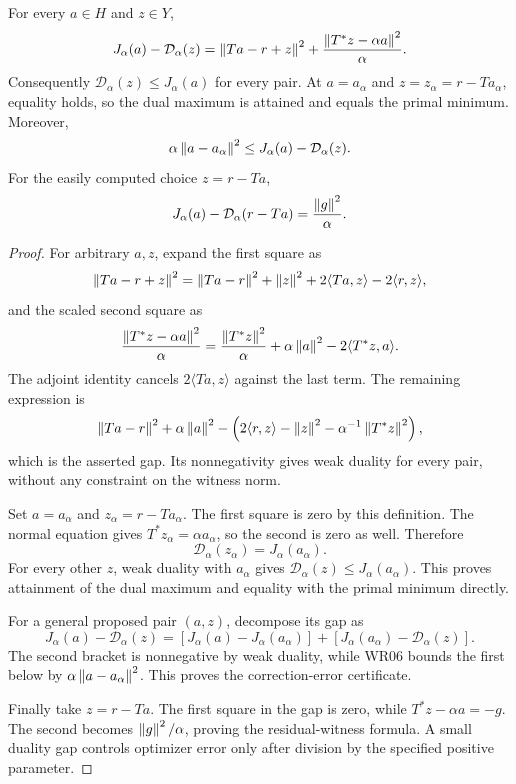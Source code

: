 \begin{theorem}\label{WR14}
For every $a\in H$ and $z\in Y$,
\begin{equation}\label{eq:regularized-duality-gap}
 J_\alpha(a)-\mathcal D_\alpha(z)
 =\left\lVert Ta-r+z\right\rVert^2+
   \frac{\left\lVert T^*z-\alpha a\right\rVert^2}{\alpha}.
\end{equation}
Consequently $\mathcal D_\alpha(z)\le J_\alpha(a)$ for every pair. At
$a=a_\alpha$ and $z=z_\alpha=r-Ta_\alpha$, equality holds, so the dual maximum is attained and equals the primal minimum. Moreover,
\[
 \alpha\left\lVert a-a_\alpha\right\rVert^2
 \le J_\alpha(a)-\mathcal D_\alpha(z).
\]
For the easily computed choice $z=r-Ta$,
\begin{equation}\label{eq:residual-dual-gap}
 J_\alpha(a)-\mathcal D_\alpha(r-Ta)=\frac{\left\lVert g\right\rVert^2}{\alpha}.
\end{equation}
\end{theorem}
\begin{proof}
For arbitrary $a,z$, expand the first square as
\[
 \left\lVert Ta-r+z\right\rVert^2
 =\left\lVert Ta-r\right\rVert^2+\left\lVert z\right\rVert^2+2\langle Ta,z\rangle-2\langle r,z\rangle,
\]
and the scaled second square as
\[
 \frac{\left\lVert T^*z-\alpha a\right\rVert^2}{\alpha}
 =\frac{\left\lVert T^*z\right\rVert^2}{\alpha}+\alpha\left\lVert a\right\rVert^2
       -2\langle T^*z,a\rangle.
\]
The adjoint identity cancels $2\langle Ta,z\rangle$ against the last term. The remaining expression is
\[
 \left\lVert Ta-r\right\rVert^2+\alpha\left\lVert a\right\rVert^2
 -\left(2\langle r,z\rangle-\left\lVert z\right\rVert^2
                    -\alpha^{-1}\left\lVert T^*z\right\rVert^2\right),
\]
which is the asserted gap. Its nonnegativity gives weak duality for every pair, without any constraint on the witness norm.

Set $a=a_\alpha$ and $z_\alpha=r-Ta_\alpha$. The first square is zero by this definition. The normal equation gives $T^*z_\alpha=\alpha a_\alpha$, so the second is zero as well. Therefore
\[
 \mathcal D_\alpha(z_\alpha)=J_\alpha(a_\alpha).
\]
For every other $z$, weak duality with $a_\alpha$ gives $\mathcal D_\alpha(z)\le J_\alpha(a_\alpha)$. This proves attainment of the dual maximum and equality with the primal minimum directly.

For a general proposed pair $(a,z)$, decompose its gap as
\[
 J_\alpha(a)-\mathcal D_\alpha(z)
 =[J_\alpha(a)-J_\alpha(a_\alpha)]
  +[J_\alpha(a_\alpha)-\mathcal D_\alpha(z)].
\]
The second bracket is nonnegative by weak duality, while WR06 bounds the first below by $\alpha\left\lVert a-a_\alpha\right\rVert^2$. This proves the correction-error certificate.

Finally take $z=r-Ta$. The first square in the gap is zero, while $T^*z-\alpha a=-g$. The second becomes $\left\lVert g\right\rVert^2/\alpha$, proving the residual-witness formula. A small duality gap controls optimizer error only after division by the specified positive parameter.
\end{proof}

